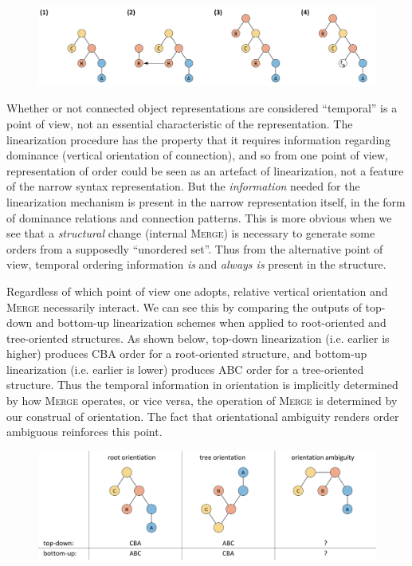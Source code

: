  
\begin{figure}
\includegraphics[width=\textwidth]{figures/Tilsen-img43.png}
\caption{\missingcaption}
\label{fig:3:15}
\end{figure}
 

  Whether or not connected object representations are considered “temporal” is a point of view, not an essential characteristic of the representation. The linearization procedure has the property that it requires information regarding dominance (vertical orientation of connection), and so from one point of view, representation of order could be seen as an artefact of linearization, not a feature of the narrow syntax representation. But the \textit{information} needed for the linearization mechanism is present in the narrow representation itself, in the form of dominance relations and connection patterns. This is more obvious when we see that a \textit{structural} change (internal \textsc{Merge}) is necessary to generate some orders from a supposedly “unordered set”. Thus from the alternative point of view, temporal ordering information \textit{is} and \textit{always is} present in the structure. 

  Regardless of which point of view one adopts, relative vertical orientation and \textsc{Merge} necessarily interact. We can see this by comparing the outputs of top-down and bottom-up linearization schemes when applied to root-oriented and tree-oriented structures. As shown below, top-down linearization (i.e. earlier is higher) produces CBA order for a root-oriented structure, and bottom-up linearization (i.e. earlier is lower) produces ABC order for a tree-oriented structure. Thus the temporal information in orientation is implicitly determined by how \textsc{Merge} operates, or vice versa, the operation of \textsc{Merge} is determined by our construal of orientation. The fact that orientational ambiguity renders order ambiguous reinforces this point.

  
\begin{figure}
\includegraphics[width=\textwidth]{figures/Tilsen-img44.png}
\caption{\missingcaption}
\label{fig:3:16}
\end{figure}
 

